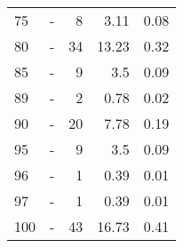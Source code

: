 \begin{longtable}{lXrrr}
        75 & \multicolumn{1}{X}{-} & %
          \num{8} &
          \num[round-mode=places,round-precision=2]{3,11} &
          \num[round-mode=places,round-precision=2]{0,08} \\

        80 & \multicolumn{1}{X}{-} & %
          \num{34} &
          \num[round-mode=places,round-precision=2]{13,23} &
          \num[round-mode=places,round-precision=2]{0,32} \\

        85 & \multicolumn{1}{X}{-} & %
          \num{9} &
          \num[round-mode=places,round-precision=2]{3,5} &
          \num[round-mode=places,round-precision=2]{0,09} \\

        89 & \multicolumn{1}{X}{-} & %
          \num{2} &
          \num[round-mode=places,round-precision=2]{0,78} &
          \num[round-mode=places,round-precision=2]{0,02} \\

        90 & \multicolumn{1}{X}{-} & %
          \num{20} &
          \num[round-mode=places,round-precision=2]{7,78} &
          \num[round-mode=places,round-precision=2]{0,19} \\

        95 & \multicolumn{1}{X}{-} & %
          \num{9} &
          \num[round-mode=places,round-precision=2]{3,5} &
          \num[round-mode=places,round-precision=2]{0,09} \\

        96 & \multicolumn{1}{X}{-} & %
          \num{1} &
          \num[round-mode=places,round-precision=2]{0,39} &
          \num[round-mode=places,round-precision=2]{0,01} \\

        97 & \multicolumn{1}{X}{-} & %
          \num{1} &
          \num[round-mode=places,round-precision=2]{0,39} &
          \num[round-mode=places,round-precision=2]{0,01} \\

        100 & \multicolumn{1}{X}{-} & %
          \num{43} &
          \num[round-mode=places,round-precision=2]{16,73} &
          \num[round-mode=places,round-precision=2]{0,41} \\


\end{longtable}
